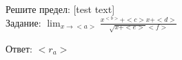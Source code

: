 \documentclass{article}%
\begin{document}
\begin{problem*}
Решите предел: [test text] \\
Задание: $ \lim_{x \to {<a>}} \frac{x^{<b>}+<c>x+<d>}{\sqrt{x + <e>} <f>} $%
\end{problem*}

\begin{solution*}
Ответ: $<r_a>$
\end{solution*}
\end{document}
